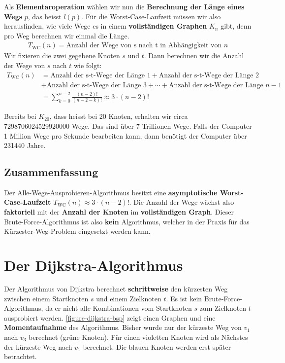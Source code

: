 Als \textbf{Elementaroperation} wählen wir nun die \textbf{Berechnung der Länge eines Wegs} $p$, das heisst $l(p)$. Für die Worst-Case-Laufzeit müssen wir also herausfinden, wie viele Wege es in einem \textbf{vollständigen Graphen} $K_n$ gibt, denn pro Weg berechnen wir einmal die Länge.
\begin{align*}
T_{\text{WC}}(n) = \text{Anzahl der Wege von s nach t in Abhängigkeit von } n
\end{align*}
Wir fixieren die zwei gegebene Knoten $s$ und $t$. Dann berechnen wir die Anzahl der Wege von $s$ nach $t$ wie folgt:
\begin{align*}
T_{\text{WC}}(n) & = \text{Anzahl der s-t-Wege der Länge 1} + \text{Anzahl der s-t-Wege der Länge 2} \\ & + \text{Anzahl der s-t-Wege der Länge 3} + \cdots + \text{Anzahl der s-t-Wege der Länge } n-1 \\ & = \sum_{k=0}^{n-2}\frac{(n-2)!}{(n-2-k)!} \approx 3\cdot(n-2)!
\end{align*}

Bereits bei $K_{20}$, dass heisst bei \num{20} Knoten, erhalten wir circa \num{7298706024529920000} Wege. Das sind über \num{7} Trillionen Wege. Falls der Computer \num{1} Million Wege pro Sekunde bearbeiten kann, dann benötigt der Computer über \num{231440} Jahre.

\subsection{Zusammenfassung}

Der Alle-Wege-Ausprobieren-Algorithmus besitzt eine \textbf{asymptotische Worst-Case-Laufzeit $T_{\text{WC}}(n)\approx 3\cdot(n-2)!$}. Die Anzahl der Wege wächst also \textbf{faktoriell} mit der \textbf{Anzahl der Knoten} im \textbf{vollständigen Graph}. Dieser Brute-Force-Algorithmus ist also \textbf{kein} Algorithmus, welcher in der Praxis für das Kürzester-Weg-Problem eingesetzt werden kann.

\section{Der Dijkstra-Algorithmus}

Der Algorithmus von Dijkstra berechnet \textbf{schrittweise} den kürzesten Weg zwischen einem Startknoten $s$ und einem Zielknoten $t$. Es ist kein Brute-Force-Algorithmus, da er nicht alle Kombinationen vom Startknoten $s$ zum Zielknoten $t$ ausprobiert werden. \autoref{figure-dijkstra-bsp} zeigt einen Graphen und eine \textbf{Momentaufnahme} des Algorithmus. Bisher wurde nur der kürzeste Weg von $v_1$ nach $v_3$ berechnet (grüne Knoten). Für einen violetten Knoten wird als Nächstes der kürzeste Weg nach $v_1$ berechnet. Die blauen Knoten werden erst später betrachtet.

